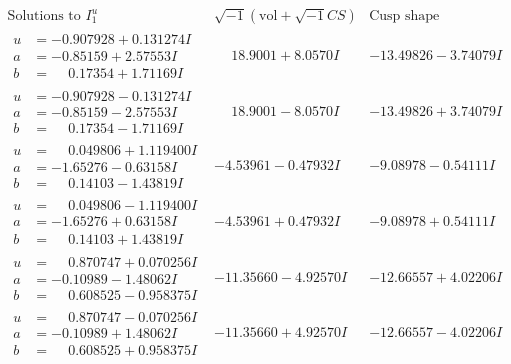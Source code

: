 \documentclass[1p]{elsarticle_modified}
\theoremstyle{definition}
\newcommand{\I}{\sqrt{-1}}
\begin{document}
$$\begin{array}{c|c|c}  
\text{Solutions to }I^u_{1}& \I (\text{vol} + \sqrt{-1}CS) & \text{Cusp shape}\\
 \hline 
\begin{aligned}
u &= -0.907928 + 0.131274 I \\
a &= -0.85159 + 2.57553 I \\
b &= \phantom{-}0.17354 + 1.71169 I\end{aligned}
 & \phantom{-}18.9001 + 8.0570 I & -13.49826 - 3.74079 I \\ \hline\begin{aligned}
u &= -0.907928 - 0.131274 I \\
a &= -0.85159 - 2.57553 I \\
b &= \phantom{-}0.17354 - 1.71169 I\end{aligned}
 & \phantom{-}18.9001 - 8.0570 I & -13.49826 + 3.74079 I \\ \hline\begin{aligned}
u &= \phantom{-}0.049806 + 1.119400 I \\
a &= -1.65276 - 0.63158 I \\
b &= \phantom{-}0.14103 - 1.43819 I\end{aligned}
 & -4.53961 - 0.47932 I & -9.08978 - 0.54111 I \\ \hline\begin{aligned}
u &= \phantom{-}0.049806 - 1.119400 I \\
a &= -1.65276 + 0.63158 I \\
b &= \phantom{-}0.14103 + 1.43819 I\end{aligned}
 & -4.53961 + 0.47932 I & -9.08978 + 0.54111 I \\ \hline\begin{aligned}
u &= \phantom{-}0.870747 + 0.070256 I \\
a &= -0.10989 - 1.48062 I \\
b &= \phantom{-}0.608525 - 0.958375 I\end{aligned}
 & -11.35660 - 4.92570 I & -12.66557 + 4.02206 I \\ \hline\begin{aligned}
u &= \phantom{-}0.870747 - 0.070256 I \\
a &= -0.10989 + 1.48062 I \\
b &= \phantom{-}0.608525 + 0.958375 I\end{aligned}
 & -11.35660 + 4.92570 I & -12.66557 - 4.02206 I \\ \hline\begin{aligned}

\end{aligned}
\end{array}$$
\end{document}
